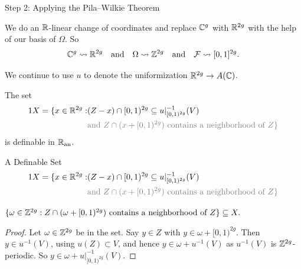 \documentclass{beamer}
\begin{document}
\begin{frame}{Step 2: Applying the Pila--Wilkie Theorem}


  We do an ${\mathbb{R}}$-linear change of coordinates and
  replace ${\mathbb{C}}^g$ with ${\mathbb{R}}^{2g}$ with the help of our basis of
  $\Omega$. So
  \begin{equation*}
    {\mathbb{C}}^g\leadsto {\mathbb{R}}^{2g}\quad\text{and}\quad
    \Omega \leadsto {\mathbb{Z}}^{2g} \quad\text{and}\quad {\mathcal F} \leadsto
    [0,1]^{2g}.
  \end{equation*}  

  We continue to use $u$ to denote the uniformization ${\mathbb{R}}^{2g}
  \rightarrow A({\mathbb{C}})$.
  
  The set
  \begin{alignat*}1  
    X =  \{x \in\IR^{2g} : & (Z-x)\cap [0,1)^{2g} \subset u|_{[0,1)^{2g}}^{-1}(V)\\
    &\color{gray}{\text{and } Z\cap(x+[0,1)^{2g})\text{ contains a
        neighborhood of $Z$}}
    \}
  \end{alignat*}
  is definable in ${{\mathbb{R}}_{\mathrm{an}}}$.
   
\end{frame}

\begin{frame}{A Definable Set} 
  \begin{alignat*}1  
    X =  \{x \in\IR^{2g} : & (Z-x)\cap [0,1)^{2g} \subset u|_{[0,1)^{2g}}^{-1}(V)\\
    &\color{gray}{\text{and } Z\cap(x+[0,1)^{2g})\text{ contains a
        neighborhood of $Z$}}
    \}
  \end{alignat*}
  
  \begin{lemma}
    $\{\omega\in{\mathbb{Z}}^{2g} :    Z\cap (\omega+[0,1)^{2g})\text{
      contains a neighborhood  of $Z$}\} \subseteq X.$
  \end{lemma}
  \begin{proof}
    Let $\omega \in{\mathbb{Z}}^{2g}$ be in the set. 
    Say $y\in Z$ with $y\in \omega+[0,1)^{2g}$. Then $y\in
    u^{-1}(V)$, using $u(Z)\subset V$, and hence $y \in \omega+u^{-1}(V)$
    as $u^{-1}(V)$ is ${\mathbb{Z}}^{2g}$-periodic. So $y \in
    \omega+u|_{[0,1)^{2g}}^{-1}(V)$.
  \end{proof}  
\end{frame}
\end{document}
